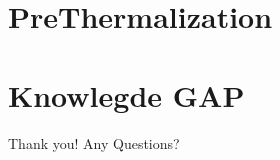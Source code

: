 \documentclass{beamer}
\begin{document}
\section{PreThermalization}


\section{Knowlegde GAP}




\begin{frame}{Thank you!}
    \centering
    \Huge
    Any Questions?
\end{frame}
\end{document}
